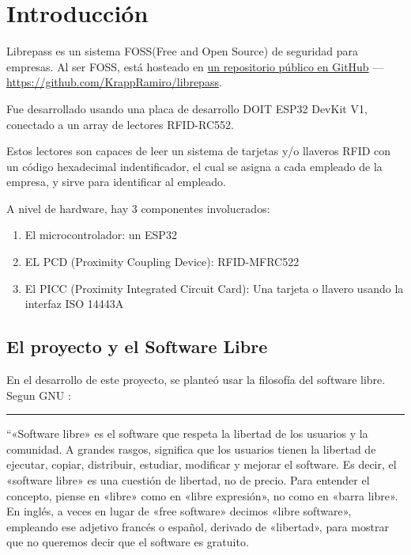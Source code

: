 \documentclass[../informe_krapp.tex]{subfiles}
\begin{document}
\graphicspath{{../images/}}
{
\renewcommand{\subsectionbreak}{}
\section{Introducción}

Librepass es un sistema FOSS(Free and Open Source) de seguridad para empresas.
Al ser FOSS, está hosteado en
\href{https://github.com/KrappRamiro/librepass}{un repositorio público en GitHub} ---
{\small \url{https://github.com/KrappRamiro/librepass}}.


Fue desarrollado usando una placa de desarrollo DOIT ESP32 DevKit V1, conectado
a un array de lectores RFID-RC552.

Estos lectores son capaces de leer un sistema de tarjetas y/o llaveros RFID con un
código hexadecimal indentificador, el cual se asigna a cada empleado de la empresa, y
sirve para identificar al empleado.

A nivel de hardware, hay 3 componentes involucrados:
\begin{enumerate}
	\item El microcontrolador: un ESP32
	\item EL PCD (Proximity Coupling Device): RFID-MFRC522
	\item El PICC (Proximity Integrated Circuit Card): Una tarjeta o llavero usando
	      la interfaz ISO 14443A
\end{enumerate}

\subsection{El proyecto y el Software Libre}
En el desarrollo de este proyecto, se planteó usar la filosofía del software libre.
Segun GNU \cite{gnu}:
\begin{center}
	\rule{0.8\textwidth}{0.3pt}
\end{center}
``«Software libre» es el software que respeta la libertad de los usuarios y la comunidad. A grandes rasgos, significa que los usuarios tienen la libertad de ejecutar, copiar, distribuir, estudiar, modificar y mejorar el software. Es decir, el «software libre» es una cuestión de libertad, no de precio. Para entender el concepto, piense en «libre» como en «libre expresión», no como en «barra libre». En inglés, a veces en lugar de «free software» decimos «libre software», empleando ese adjetivo francés o español, derivado de «libertad», para mostrar que no queremos decir que el software es gratuito.

}
\end{document}
